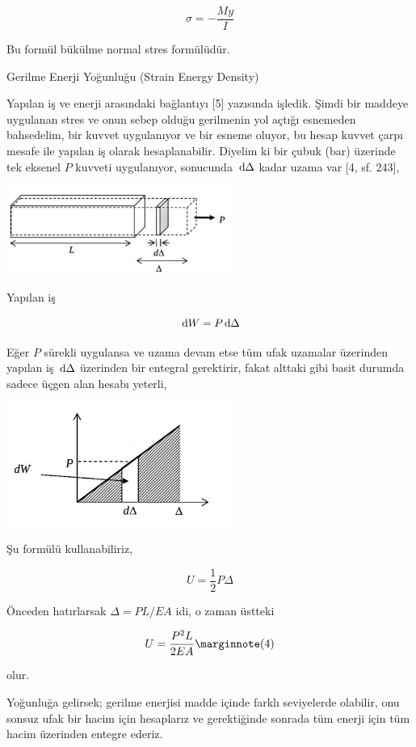 \documentclass[12pt,fleqn]{article}\usepackage{../../common}
\begin{document}
$$
\sigma = - \frac{M y}{I}
$$

Bu formül bükülme normal stres formülüdür.

Gerilme Enerji Yoğunluğu (Strain Energy Density)

Yapılan iş ve enerji arasındaki bağlantıyı [5] yazısında işledik. Şimdi bir
maddeye uygulanan stres ve onun sebep olduğu gerilmenin yol açtığı esnemeden
bahsedelim, bir kuvvet uygulanıyor ve bir esneme oluyor, bu hesap kuvvet çarpı
mesafe ile yapılan iş olarak hesaplanabilir. Diyelim ki bir çubuk (bar) üzerinde
tek eksenel $P$ kuvveti uygulanıyor, sonucunda $\,\mathrm{d} \Delta$ kadar uzama var
[4, sf. 243],

\includegraphics[width=20em]{phy_020_strs_00_07.jpg}

Yapılan iş

$$
\,\mathrm{d} W = P \,\mathrm{d} \Delta
$$

Eğer $P$ sürekli uygulansa ve uzama devam etse tüm ufak uzamalar üzerinden
yapılan iş $\,\mathrm{d} \Delta$ üzerinden bir entegral gerektirir, fakat alttaki
gibi basit durumda sadece üçgen alan hesabı yeterli,

\includegraphics[width=20em]{phy_020_strs_00_08.jpg}

Şu formülü kullanabiliriz,

$$
U = \frac{1}{2} P \Delta
$$

Önceden hatırlarsak $\Delta = PL / EA$ idi, o zaman üstteki 

$$
U = \frac{P^2 L}{2 E A}
\mlabel{4}
$$

olur.

Yoğunluğa gelirsek; gerilme enerjisi madde içinde farklı seviyelerde olabilir,
onu sonsuz ufak bir hacim için hesaplarız ve gerektiğinde sonrada tüm enerji
için tüm hacim üzerinden entegre ederiz.
\end{document}
